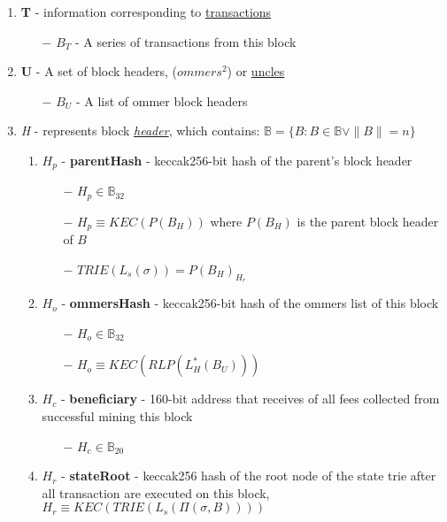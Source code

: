 \documentclass{article}
\begin{document}
\begin{enumerate}
    \item \textbf{T} - information corresponding to \underline{transactions}
    \begin{enumerate}
        \item[$-$] $B_{T}$ - A series of transactions from this block
    \end{enumerate}
    \item \textbf{U} - A set of block headers, ($ommers^2$) or \underline{uncles}
    \begin{enumerate}
        \item[$-$] $B_U$ - A list of ommer block headers
    \end{enumerate}
    \item \textit{H} - represents block \underline{\textit{header}}, which contains: $\mathbb{B} = \{B : B \in \mathbb{B}\lor \| B \| = n\}$
    \begin{enumerate}
        \item $H_p$ - \textbf{parentHash} - keccak256-bit hash of the parent's block header
        \begin{enumerate}
            \item[$-$] $H_p \in \mathbb{B}_{32}$
            \item[$-$] $H_p \equiv KEC(P(B_H))$ where $P(B_H)$ is the parent block header of $B$
            \item[$-$] $TRIE(L_s(\sigma)) = P(B_H)_{H_r}$
        \end{enumerate}
        \item $H_o$ - \textbf{ommersHash} - keccak256-bit hash of the ommers list of this block
        \begin{enumerate}
            \item[$-$] $H_o \in \mathbb{B}_{32}$
            \item[$-$] $H_o \equiv KEC(RLP(L_H^*(B_U)))$
        \end{enumerate}
        \item $H_c$ - \textbf{beneficiary} - 160-bit address that receives of all fees collected from successful mining this block
        \begin{enumerate}
            \item[$-$] $H_c \in \mathbb{B}_{20}$
        \end{enumerate}
        \item $H_r$ - \textbf{stateRoot} - keccak256 hash of the root node of the state trie after all transaction are executed on this block, $H_r \equiv KEC(TRIE(L_s(\Pi(\sigma,B))))$

\end{enumerate}
\end{enumerate}
\end{document}
